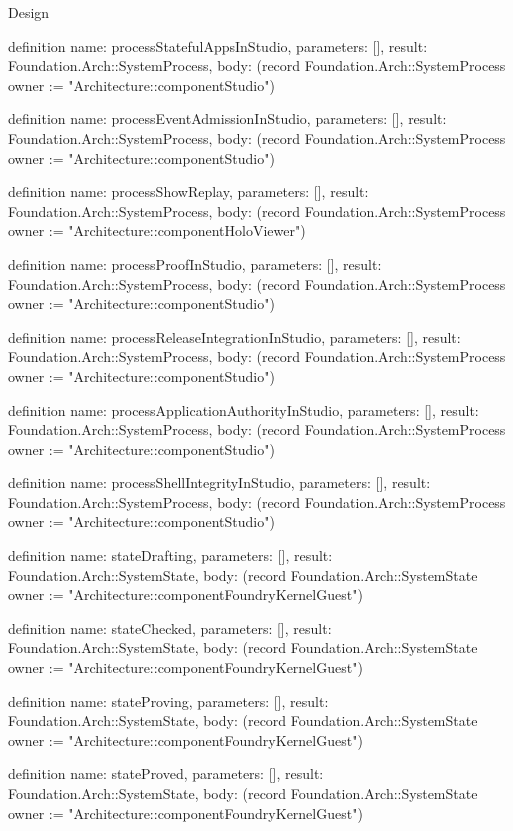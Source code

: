 \begin{lexlean}{Design}
\begin{semanticmodule}
definition{
  name: processStatefulAppsInStudio,
  parameters: [],
  result: Foundation.Arch::SystemProcess,
  body: (record Foundation.Arch::SystemProcess {owner := "Architecture::componentStudio"})
}

definition{
  name: processEventAdmissionInStudio,
  parameters: [],
  result: Foundation.Arch::SystemProcess,
  body: (record Foundation.Arch::SystemProcess {owner := "Architecture::componentStudio"})
}

definition{
  name: processShowReplay,
  parameters: [],
  result: Foundation.Arch::SystemProcess,
  body: (record Foundation.Arch::SystemProcess {owner := "Architecture::componentHoloViewer"})
}

definition{
  name: processProofInStudio,
  parameters: [],
  result: Foundation.Arch::SystemProcess,
  body: (record Foundation.Arch::SystemProcess {owner := "Architecture::componentStudio"})
}

definition{
  name: processReleaseIntegrationInStudio,
  parameters: [],
  result: Foundation.Arch::SystemProcess,
  body: (record Foundation.Arch::SystemProcess {owner := "Architecture::componentStudio"})
}

definition{
  name: processApplicationAuthorityInStudio,
  parameters: [],
  result: Foundation.Arch::SystemProcess,
  body: (record Foundation.Arch::SystemProcess {owner := "Architecture::componentStudio"})
}

definition{
  name: processShellIntegrityInStudio,
  parameters: [],
  result: Foundation.Arch::SystemProcess,
  body: (record Foundation.Arch::SystemProcess {owner := "Architecture::componentStudio"})
}

definition{
  name: stateDrafting,
  parameters: [],
  result: Foundation.Arch::SystemState,
  body: (record Foundation.Arch::SystemState {owner := "Architecture::componentFoundryKernelGuest"})
}

definition{
  name: stateChecked,
  parameters: [],
  result: Foundation.Arch::SystemState,
  body: (record Foundation.Arch::SystemState {owner := "Architecture::componentFoundryKernelGuest"})
}

definition{
  name: stateProving,
  parameters: [],
  result: Foundation.Arch::SystemState,
  body: (record Foundation.Arch::SystemState {owner := "Architecture::componentFoundryKernelGuest"})
}

definition{
  name: stateProved,
  parameters: [],
  result: Foundation.Arch::SystemState,
  body: (record Foundation.Arch::SystemState {owner := "Architecture::componentFoundryKernelGuest"})
}


\end{semanticmodule}
\end{lexlean}
